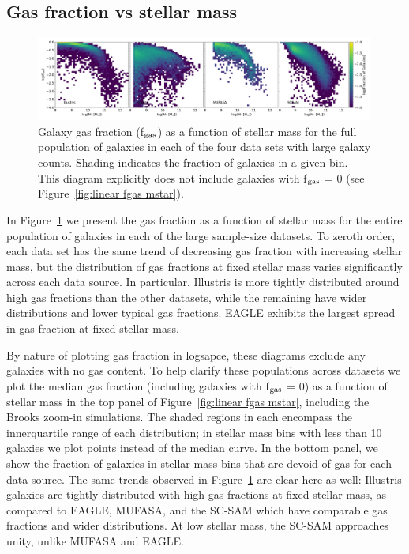 \documentclass[fleqn,usenatbib]{mnras}
\begin{document}
\subsection{Gas fraction vs stellar mass}
\label{sec:results:fg Mstar}

\begin{figure}
\includegraphics[width = 0.99\textwidth]{fgas_mstar_2D_log_fgas.png}
\caption{Galaxy gas fraction (f$_{\rm gas}$) as a function of stellar mass for the full population of galaxies in each of the four data sets with large galaxy counts. Shading indicates the fraction of galaxies in a given bin. This diagram explicitly does not include galaxies with f$_{\rm gas}$ = 0 (see Figure~\ref{fig:linear fgas mstar}).}
\label{fig:fgas mstar 2D}
\end{figure}

In Figure~\ref{fig:fgas mstar 2D} we present the gas fraction as a function of stellar mass for the entire population of galaxies in each of the large sample-size datasets. To zeroth order, each data set has the same trend of decreasing gas fraction with increasing stellar mass, but the distribution of gas fractions at fixed stellar mass varies significantly across each data source. In particular, Illustris is more tightly distributed around high gas fractions than the other datasets, while the remaining have wider distributions and lower typical gas fractions. EAGLE exhibits the largest spread in gas fraction at fixed stellar mass. 

By nature of plotting gas fraction in logsapce, these diagrams exclude any galaxies with no gas content. To help clarify these populations across datasets we plot the median gas fraction (including galaxies with f$_{\rm gas}$ = 0) as a function of stellar mass in the top panel of Figure~\ref{fig:linear fgas mstar}, including the Brooks zoom-in simulations. The shaded regions in each encompass the innerquartile range of each distribution; in stellar mass bins with less than 10 galaxies we plot points instead of the median curve. In the bottom panel, we show the fraction of galaxies in stellar mass bins that are devoid of gas for each data source. The same trends observed in Figure~\ref{fig:fgas mstar 2D} are clear here as well: Illustris galaxies are tightly distributed with high gas fractions at fixed stellar mass, as compared to EAGLE, MUFASA, and the SC-SAM which have comparable gas fractions and wider distributions. At low stellar mass, the SC-SAM approaches unity, unlike MUFASA and EAGLE. 
\end{document}
